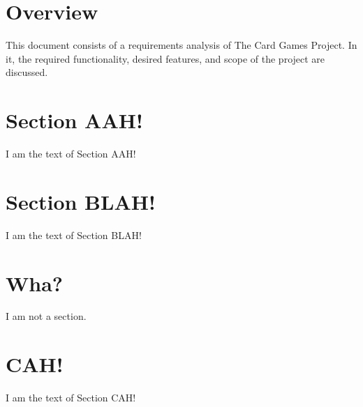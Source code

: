\documentclass{article}[12pt,a4paper]
\title{\sc{The Card Games Project}}
\subtitle{\textbf{Software Requirements Specification Document}}
\author{\Large{Richard Douglas}}
\date{\today{}}
\begin{document}
  \maketitle
  
  \section*{Overview}
  This document consists of a requirements analysis of The Card Games Project.
  In it, the required functionality, desired features, and scope of the project are discussed.
  
  \tableofcontents
  
  \pagebreak
  
  \section{Section AAH!}
  I am the text of Section AAH!
  
  \section{Section BLAH!}
  I am the text of Section BLAH!
  
  \section*{Wha?}
  I am not a section.
  
  \section{CAH!}
  I am the text of Section CAH!
\end{document}
